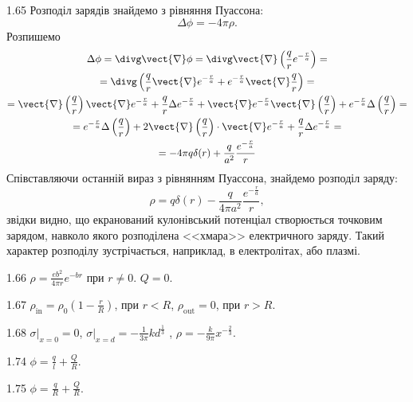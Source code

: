 \begin{Solution}{1.{65}}
	Розподіл зарядів знайдемо з рівняння Пуассона:
	\[
		\Delta\phi = -4\pi\rho.
	\]
	Розпишемо
	\begin{multline*}
		\Delta\phi = \divg\vect{\nabla}\phi = \divg\vect{\nabla}\left( \frac{q}{r}e^{-\frac{r}{a}}\right)  = \\
		= \divg\left( \frac{q}{r}  \vect{\nabla}e^{-\frac{r}{a}} + e^{-\frac{r}{a}}\vect{\nabla}\frac{q}{r}\right) = \\
		= \vect{\nabla}\left( \frac{q}{r}\right) \vect{\nabla}e^{-\frac{r}{a}} + \frac{q}{r}\Delta e^{-\frac{r}{a}} +
		\vect{\nabla}e^{-\frac{r}{a}} \vect{\nabla}\left( \frac{q}{r}\right)  + e^{-\frac{r}{a}}\Delta\left( \frac{q}{r}\right) = \\
		= e^{-\frac{r}{a}}\Delta\left( \frac{q}{r}\right) + 2 \vect{\nabla}\left( \frac{q}{r}\right)\cdot \vect{\nabla}e^{-\frac{r}{a}} + \frac{q}{r}\Delta e^{-\frac{r}{a}} =\\
		= -4\pi q\delta(r)	+ \frac{q}{a^2}\frac{e^{-\frac{r}{a}}}{r}
	\end{multline*}
	Співставляючи останній вираз з рівнянням Пуассона, знайдемо розподіл заряду:
	\[
		\rho = q\delta(r) - \frac{q}{4\pi a^2} \frac{e^{-\frac{r}{a}}}{r},
	\]
	звідки видно, що екранований кулонівський потенціал створюється точковим зарядом, навколо якого розподілена <<хмара>> електричного заряду. Такий характер розподілу зустрічається, наприклад, в електролітах, або плазмі.
\end{Solution}
\begin{Solution}{1.{66}}
	$\rho = \frac{eb^2}{4\pi r}e^{-br}$ при $r \neq 0$. $Q = 0$.
\end{Solution}
\begin{Solution}{1.{67}}
	$\rho_{\mathrm{in}} = \rho_0\left( 1 - \frac{r}{R}\right)$, при $r <R$, $\rho_{\mathrm{out}} = 0$, при $r > R$.
\end{Solution}
\begin{Solution}{1.{68}}
	$\left. \sigma\right|_{x=0} = 0$, $\left. \sigma\right|_{x=d} = -\frac{1}{3\pi}kd^{\frac13}$ , $\rho = -\frac{k}{9\pi} x^{-\frac{2}{3}}$.
\end{Solution}
\begin{Solution}{1.{74}}
		$\phi = \frac{q}{l} + \frac{Q}{R}.$
	
\end{Solution}
\begin{Solution}{1.{75}}
		$\phi = \frac{q}{R} + \frac{Q}{R}.$
	
\end{Solution}

